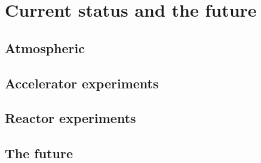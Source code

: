 \section{Current status and the future}
\label{sec:theory_status}

\subsection{Atmospheric}

\subsection{Accelerator experiments}

\subsection{Reactor experiments}

\subsection{The future}